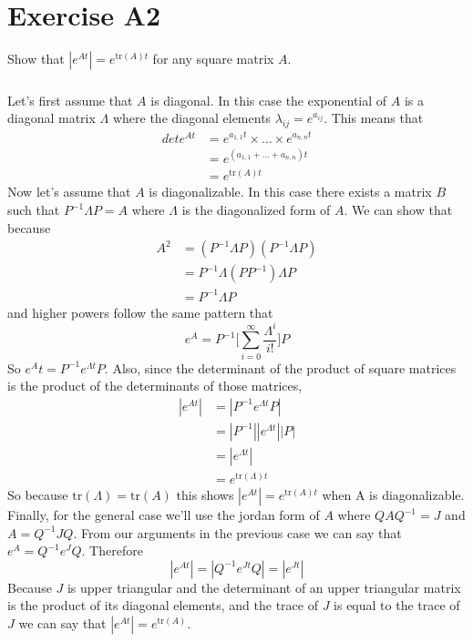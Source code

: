 \documentclass[11pt]{article}
\begin{document}
\section*{Exercise A2}
Show that $|e^{At}|=e^{\text{tr}(A)t}$ for any square matrix $A$.

\subparagraph*{}
Let's first assume that $A$ is diagonal. In this case the exponential of $A$ is a diagonal matrix $\Lambda$ where the diagonal elements $\lambda_{ij} = e^{a_{ij}}$. This means that
\begin{align*}
	det{e^{At}} &= e^{a_{1,1}t} \times \dots \times e^{a_{n,n}t} \\
	&= e^{(a_{1,1} + \dots + a_{n,n})t} \\
	&= e^{\text{tr}(A)t}
\end{align*}
Now let's assume that $A$ is diagonalizable. In this case there exists a matrix $B$ such that $P^{-1}\Lambda P = A$ where $\Lambda$ is the diagonalized form of $A$. We can show that because
\begin{align*}
	A^2 &= (P^{-1}\Lambda P)(P^{-1}\Lambda P) \\
	&= P^{-1}\Lambda (PP^{-1}) \Lambda P \\
	&= P^{-1} \Lambda P
\end{align*}
and higher powers follow the same pattern that
\begin{equation*}
	e^A = P^{-1}\Bigg[\sum_{i=0}^\infty \frac{\Lambda^i}{i!} \Bigg] P
\end{equation*}
So $e^At = P^{-1}e^{\Lambda t} P$. Also, since the determinant of the product of square matrices is the product of the determinants of those matrices,
\begin{align*}
	|e^{At}| &= |P^{-1}e^{\Lambda t}P| \\
	&= |P^{-1}||e^{\Lambda t}||P| \\
	&= |e^{\Lambda t}| \\
	&= e^{\text{tr}(\Lambda) t}
\end{align*}
So because $\text{tr}(\Lambda)=\text{tr}(A)$ this shows $|e^{At}|=e^{\text{tr}(A)t}$ when A is diagonalizable. Finally, for the general case we'll use the jordan form of $A$ where $QAQ^{-1}=J$ and $A=Q^{-1}JQ$. From our arguments in the previous case we can say that $e^A=Q^{-1}e^JQ$. Therefore
\begin{equation*}
	|e^{At}| = |Q^{-1}e^{Jt}Q|=|e^{Jt}|
\end{equation*}
Because $J$ is upper triangular and the determinant of an upper triangular matrix is the product of its diagonal elements, and the trace of $J$ is equal to the trace of $J$ we can say that $|e^{At}| = e^{\text{tr}(A)}$.
\end{document}
